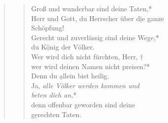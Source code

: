 \vspace{0.3cm}

\def\greinitialformat#1{{\fontsize{40}{40}\selectfont #1}}
\gresetfirstlineaboveinitial{\small \textcolor{red}{Ap 15, 3-4}}{}
\setaboveinitialseparation{0.72mm}



\begin{quote}
\begin{verse}


Groß und wunderbar sind deine Taten,*\\
Herr und Gott, du Herrscher über d\d ie ganze\\ Schöpfung!\\
\vin Gerecht und zuverlässig sind deine Wege,*\\
\vin du K\d önig der Völker.\\
Wer wird dich nicht fürchten, Herr, †\\
wer wird  deinen Namen nicht preisen?*\\
Denn du \d allein bist heilig.\\
\vin Ja, \textit{alle Völker werden kommen und\\ \vin  beten dich an},*\\
\vin denn offenbar geworden sind deine\\ \vin  g\d erechten Taten.\\
\end{verse}
\end{quote}


\medskip
 
